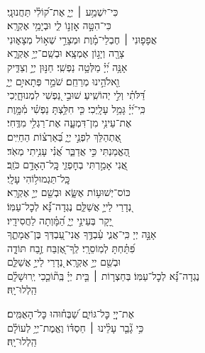 \documentclass[twoside, openany, parskip=half, 11pt]{book}
\begin{document}
{\begin{narrow}
\\
כִּי־יִשְׁמַ֥ע ׀ יְיָ֑ \hfill אֶת־ק֝וֹלִ֗י תַּחֲנוּנָֽי׃ \\
כִּי־הִטָּ֣ה אׇזְנ֣וֹ לִ֑י \hfill וּבְיָמַ֥י אֶקְרָֽא׃ \\
אֲפָפ֤וּנִי ׀ חֶבְלֵי־מָ֗וֶת \hfill וּמְצָרֵ֣י שְׁא֣וֹל מְצָא֑וּנִי\\ צָרָ֖ה וְיָג֣וֹן אֶמְצָֽא׃ \hfill
וּבְשֵֽׁם־יְיָ֥ אֶקְרָ֑א\\ אָנָּ֥ה יְ֝יָ֗ מַלְּטָ֥ה נַפְשִֽׁי׃ \hfill
חַנּ֣וּן יְיָ֣ וְצַדִּ֑יק\\ וֵ֖אלֹהֵ֣ינוּ מְרַחֵֽם׃ \hfill
שֹׁמֵ֣ר פְּתָאיִ֣ם יְיָ֑\\ דַּ֝לֹּתִ֗י וְלִ֣י יְהוֹשִֽׁיעַ׃ \hfill
שׁוּבִ֣י נַ֭פְשִׁי לִמְנוּחָ֑יְכִי\\ כִּֽי־יְ֝יָ֗ גָּמַ֥ל עָלָֽיְכִי׃ \hfill
כִּ֤י חִלַּ֥צְתָּ נַפְשִׁ֗י מִ֫מָּ֥וֶת\\ אֶת־עֵינִ֥י מִן־דִּמְעָ֑ה \hfill אֶת־רַגְלִ֥י מִדֶּֽחִי׃ \\
אֶ֭תְהַלֵּךְ לִפְנֵ֣י יְיָ֑ \hfill בְּ֝אַרְצ֗וֹת הַחַיִּֽים׃ \\
הֶ֭אֱמַנְתִּי כִּ֣י אֲדַבֵּ֑ר \hfill אֲ֝נִ֗י עָנִ֥יתִי מְאֹֽד׃ \\
אֲ֭נִי אָמַ֣רְתִּי בְחׇפְזִ֑י \hfill כׇּֽל־הָאָדָ֥ם כֹּזֵֽב׃ \\

 \hfill
כׇּֽל־תַּגְמוּל֥וֹהִי עָלָֽי׃ \\
כּוֹס־יְשׁוּע֥וֹת אֶשָּׂ֑א \hfill וּבְשֵׁ֖ם יְיָ֣ אֶקְרָֽא׃ \\
נְ֭דָרַי לַייָ֣ אֲשַׁלֵּ֑ם \hfill נֶגְדָה־נָּ֗֝א לְכׇל־עַמּֽוֹ׃ \\
יָ֭קָר בְּעֵינֵ֣י יְיָ֑ \hfill הַ֝מָּ֗וְתָה לַחֲסִידָֽיו׃ \\
אָנָּ֣ה יְיָ כִּֽי־אֲנִ֢י עַ֫בְדֶּ֥ךָ \hfill אֲנִי־עַ֭בְדְּךָ בֶּן־אֲמָתֶ֑ךָ\\ פִּ֝תַּ֗חְתָּ לְמֽוֹסֵרָֽי׃ \hfill
לְֽךָ־אֶ֭זְבַּח זֶ֣בַח תּוֹדָ֑ה\\ וּבְשֵׁ֖ם יְיָ֣ אֶקְרָֽא׃ \hfill
נְ֭דָרַי לַייָ֣ אֲשַׁלֵּ֑ם \\ נֶגְדָה־נָּ֗֝א לְכׇל־עַמּֽוֹ׃ \hfill
בְּחַצְר֤וֹת ׀ בֵּ֤ית יְיָ֗ בְּֽת֘וֹכֵ֤כִי יְֽרוּשָׁלָ֗‍ִם\\
הַֽלְלוּ־יָֽהּ׃ \hfill \break



אֶת־יְיָ֭ כׇּל־גּוֹיִ֑ם \hfill שַׁ֝בְּח֗וּהוּ כׇּל־הָאֻמִּֽים׃ \\
כִּ֥י גָ֘בַ֤ר עָלֵ֨ינוּ ׀ חַסְדּ֗וֹ \hfill וֶאֱמֶת־יְיָ֥ לְעוֹלָ֗ם\\
הַֽלְלוּ־יָֽהּ׃ \hfill \break


\end{narrow}}
\end{document}
